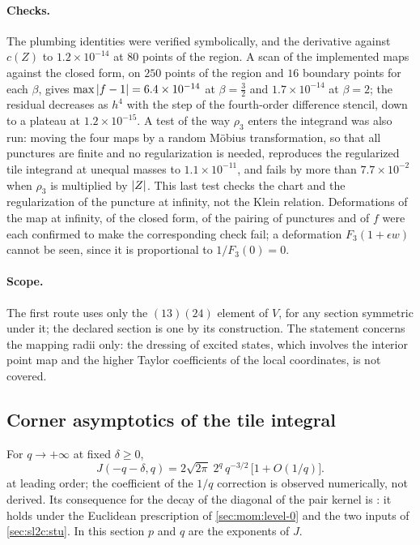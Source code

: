 \paragraph{Checks.}
The plumbing identities were verified symbolically, and the derivative against $c(Z)$ to $1.2 \times 10^{-14}$ at $80$ points of the region.
A scan of the implemented maps against the closed form, on $250$ points of the region and $16$ boundary points for each $\beta$, gives $\max {|f - 1|} = 6.4 \times 10^{-14}$ at $\beta = \frac{3}{2}$ and $1.7 \times 10^{-14}$ at $\beta = 2$; the residual decreases as $h^4$ with the step of the fourth-order difference stencil, down to a plateau at $1.2 \times 10^{-15}$.
A test of the way $\rho_3$ enters the integrand was also run: moving the four maps by a random Möbius transformation, so that all punctures are finite and no regularization is needed, reproduces the regularized tile integrand at unequal masses to $1.1 \times 10^{-11}$, and fails by more than $7.7 \times 10^{-2}$ when $\rho_3$ is multiplied by ${|Z|}$.
This last test checks the chart and the regularization of the puncture at infinity, not the Klein relation.
Deformations of the map at infinity, of the closed form, of the pairing of punctures and of $f$ were each confirmed to make the corresponding check fail; a deformation $F_3 (1 + \epsilon w)$ cannot be seen, since it is proportional to $1 / F_3(0) = 0$.

\paragraph{Scope.}
The first route uses only the $(13)(24)$ element of $V$, for any section symmetric under it; the declared section is one by its construction.
The statement concerns the mapping radii only: the dressing of excited states, which involves the interior point map and the higher Taylor coefficients of the local coordinates, is not covered.

\subsection{Corner asymptotics of the tile integral}
\label{sec:sl2c:corner}

For $q \to + \infty$ at fixed $\delta \ge 0$,
\begin{equation}
  \label{eq:sl2c:corner}
  J(- q - \delta, q)
    = 2 \sqrt{2 \pi} \; 2^q \, q^{-3/2} \, \big[ 1 + O(1 / q) \big].
\end{equation}
 at leading order; the coefficient of the $1 / q$ correction is observed numerically, not derived.
Its consequence for the decay of the diagonal of the pair kernel is : it holds under the Euclidean prescription of \cref{sec:mom:level-0} and the two inputs of \cref{sec:sl2c:stu}.
In this section $p$ and $q$ are the exponents of $J$.

